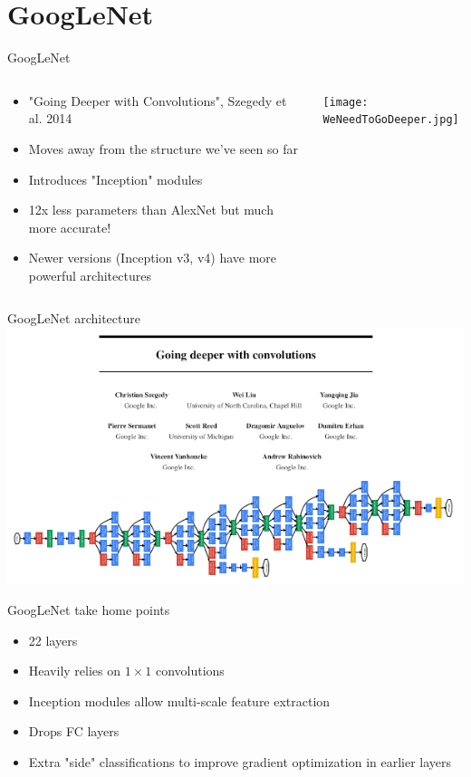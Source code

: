 \documentclass[9pt, aspectratio=169]{beamer}
\begin{document}
\section{GoogLeNet}
\begin{frame}
    {GoogLeNet}
    \begin{columns}
        \begin{column}{.5\textwidth}
            \begin{itemize}
                \item "Going Deeper with Convolutions", Szegedy et al. 2014
                \item Moves away from the structure we've seen so far
                \item Introduces "Inception" modules
                \item 12x less parameters than AlexNet but much more accurate!
                \item Newer versions (Inception v3, v4) have more powerful architectures
            \end{itemize}
        \end{column}
        \begin{column}{.5\textwidth}
            \centering
            \texttt{[image: WeNeedToGoDeeper.jpg]}
        \end{column}
    \end{columns}
\end{frame}

\begin{frame}
    {GoogLeNet architecture}
    \centering
    \includegraphics[width=\textwidth]{GoogLeNet.png}
\end{frame}

\begin{frame}
    {GoogLeNet take home points}
    \begin{itemize}
        \item 22 layers
        \item Heavily relies on $1\times 1$ convolutions
        \item Inception modules allow multi-scale feature extraction
        \item Drops FC layers
        \item Extra "side" classifications to improve gradient optimization in earlier layers
    \end{itemize}
\end{frame}
\end{document}
